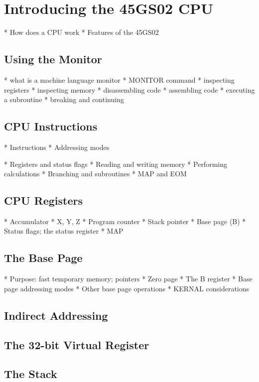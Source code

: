 \chapter{Introducing the 45GS02 CPU}
\label{cha:introducing-the-45gs02-cpu}

* How does a CPU work
* Features of the 45GS02

\section{Using the Monitor}

* what is a machine language monitor
* MONITOR command
* inspecting registers
* inspecting memory
* disassembling code
* assembling code
* executing a subroutine
* breaking and continuing

\section{CPU Instructions}

* Instructions
* Addressing modes

* Registers and status flags
* Reading and writing memory
* Performing calculations
* Branching and subroutines
* MAP and EOM

\section{CPU Registers}

* Accumulator
* X, Y, Z
* Program counter
* Stack pointer
* Base page (B)
* Status flags; the status register
* MAP

\section{The Base Page}

* Purpose: fast temporary memory; pointers
* Zero page
* The B register
* Base page addressing modes
* Other base page operations
* KERNAL considerations

\section{Indirect Addressing}


\section{The 32-bit Virtual Register}


\section{The Stack}

